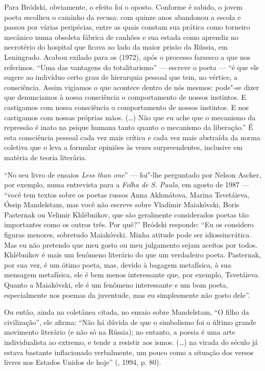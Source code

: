 Para Bródski, obviamente, o efeito foi o oposto. Conforme é sabido, o jovem
poeta escolheu o caminho da recusa: com quinze anos abandonou a escola
e passou por várias peripécias, entre as quais constam sua prática como
torneiro mecânico numa obsoleta fábrica de canhões e sua estada como aprendiz no
necrotério do hospital que ficava ao lado da maior prisão da Rússia, em
Leningrado. Acabou exilado para os  (1972), após o processo
farsesco a que nos referimos. ``Uma das vantagens do totalitarismo'' ---
escreve o poeta --- ``é que ele sugere ao indivíduo certo grau de
hierarquia pessoal que tem, no vértice, a consciência. Assim vigiamos o
que acontece dentro de nós mesmos: pode"-se dizer que denunciamos à nossa
consciência o comportamento de nossos instintos. E castigamos com nossa
consciência o comportamento de nossos instintos. E nos castigamos com
nossas próprias mãos. (\ldots{}) Não que eu ache que o mecanismo da repressão
é inato na psique humana tanto quanto o mecanismo da liberação.'' É esta
consciência pessoal cada vez mais crítica e cada vez mais abstraída da
norma coletiva que o leva a formular opiniões às vezes surpreendentes,
inclusive em matéria de teoria literária.

``No seu livro de ensaios \emph{Less than one}'' --- foi"-lhe perguntado
por Nelson Ascher, por exemplo, numa entrevista para a \emph{Folha de S. Paulo},
em agosto de 1987 --- ``você tem textos sobre os poetas russos Anna
Akhmátova, Marina Tsvetáieva, Óssip Mandelstam, mas você não escreve
sobre Vladímir Maiakóvski, Boris Pasternak ou Velimir Khlébnikov, que
são geralmente considerados poetas tão importantes como os outros três.
Por quê?'' Bródski responde: ``Eu os considero figuras menores, sobretudo Maiakóvski. Minha
atitude pode ser idiossincrática. Mas eu não pretendo que meu gosto ou
meu julgamento sejam aceitos por todos. Khlébnikov é mais um fenômeno
literário do que um verdadeiro poeta. Pasternak, por sua vez, é um ótimo
poeta, mas, devido à bagagem metafísica, à sua mensagem metafísica, ele é
bem menos interessante que, por exemplo, Tsvetáieva. Quanto a
Maiakóvski, ele é um fenômeno interessante e um bom poeta, especialmente
nos poemas da juventude, mas eu simplesmente não gosto dele''.

Ou então, ainda na coletânea citada, no ensaio sobre Mandelstam, ``O filho da civilização'', ele
afirma: ``Não há dúvida de que o simbolismo foi o último grande movimento literário (e não
só na Rússia); no entanto, a poesia é uma arte
individualista ao extremo, e tende a resistir aos ismos. (\ldots{}) na virada do século já 
estava bastante inflacionado verbalmente, um pouco como a situação
 dos versos livres nos Estados Unidos de hoje'' (, 1994, p. 80). 

